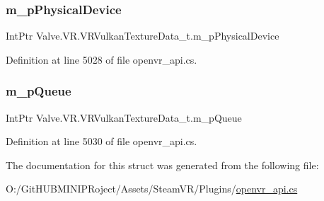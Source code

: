 \subsubsection{\texorpdfstring{m\_pPhysicalDevice}{m\_pPhysicalDevice}}
{\footnotesize\ttfamily Int\+Ptr Valve.\+V\+R.\+V\+R\+Vulkan\+Texture\+Data\+\_\+t.\+m\+\_\+p\+Physical\+Device}



Definition at line 5028 of file openvr\+\_\+api.\+cs.

\mbox{\label{struct_valve_1_1_v_r_1_1_v_r_vulkan_texture_data__t_a5cef751c75883cac0533f8b66e21b694}} 
\subsubsection{\texorpdfstring{m\_pQueue}{m\_pQueue}}
{\footnotesize\ttfamily Int\+Ptr Valve.\+V\+R.\+V\+R\+Vulkan\+Texture\+Data\+\_\+t.\+m\+\_\+p\+Queue}



Definition at line 5030 of file openvr\+\_\+api.\+cs.



The documentation for this struct was generated from the following file\+:\begin{DoxyCompactItemize}
\item 
O\+:/\+Git\+H\+U\+B\+M\+I\+N\+I\+P\+Roject/\+Assets/\+Steam\+V\+R/\+Plugins/\mbox{\hyperlink{openvr__api_8cs}{openvr\+\_\+api.\+cs}}\end{DoxyCompactItemize}
